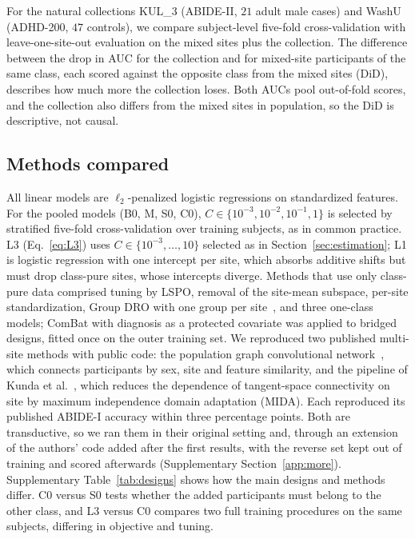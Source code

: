 For the natural collections KUL\_3 (ABIDE-II, $21$ adult male cases) and WashU (ADHD-200, $47$ controls), we compare subject-level five-fold cross-validation with leave-one-site-out evaluation on the mixed sites plus the collection. The difference between the drop in AUC for the collection and for mixed-site participants of the same class, each scored against the opposite class from the mixed sites (DiD), describes how much more the collection loses. Both AUCs pool out-of-fold scores, and the collection also differs from the mixed sites in population, so the DiD is descriptive, not causal.

\subsection{Methods compared}\label{sec:methods}

All linear models are $\ell_2$-penalized logistic regressions on standardized features. For the pooled models (B0, M, S0, C0), $C\in\{10^{-3},10^{-2},10^{-1},1\}$ is selected by stratified five-fold cross-validation over training subjects, as in common practice. L3 (Eq.~\ref{eq:L3}) uses $C\in\{10^{-3},\dots,10\}$ selected as in Section~\ref{sec:estimation}; L1 is logistic regression with one intercept per site, which absorbs additive shifts but must drop class-pure sites, whose intercepts diverge. Methods that use only class-pure data comprised tuning by LSPO, removal of the site-mean subspace, per-site standardization, Group DRO with one group per site~\cite{sagawa2020}, and three one-class models; ComBat with diagnosis as a protected covariate was applied to bridged designs, fitted once on the outer training set. We reproduced two published multi-site methods with public code: the population graph convolutional network~\cite{parisot2018}, which connects participants by sex, site and feature similarity, and the pipeline of Kunda et al.~\cite{kunda2023}, which reduces the dependence of tangent-space connectivity on site by maximum independence domain adaptation (MIDA). Each reproduced its published ABIDE-I accuracy within three percentage points. Both are transductive, so we ran them in their original setting and, through an extension of the authors' code added after the first results, with the reverse set kept out of training and scored afterwards (Supplementary Section~\ref{app:more}). Supplementary Table~\ref{tab:designs} shows how the main designs and methods differ. C0 versus S0 tests whether the added participants must belong to the other class, and L3 versus C0 compares two full training procedures on the same subjects, differing in objective and tuning.


